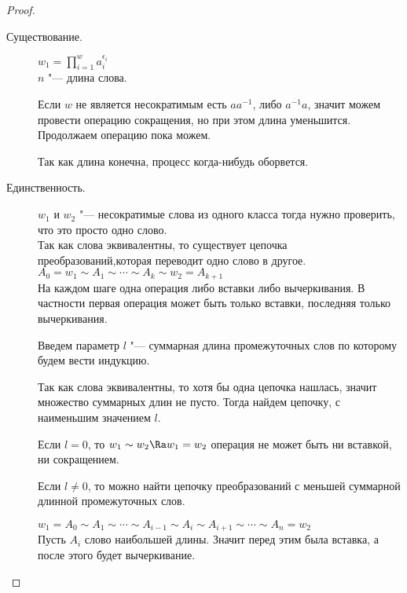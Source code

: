 \begin{proof}
 \begin{description}
 \item[Существование.]
 $w_1 = \prod_{i = 1}^{w}a_i^{\epsilon_i}$\\
 $n$ "--- длина слова.

 Если $w$ не является несократимым есть $aa^{-1}$, либо $a^{-1}a$, значит можем провести операцию 
 сокращения, но при этом длина уменьшится. Продолжаем операцию пока можем.

 Так как длина конечна, процесс когда-нибудь оборвется.
 
 \item[Единственность.]
 $w_1$ и $w_2$ "--- несократимые слова из одного класса тогда нужно проверить, что это просто одно слово.\\
 Так как слова эквивалентны, то существует цепочка преобразований,которая переводит одно слово в другое.
 $A_0 = w_1 \sim A_1 \sim \cdots \sim A_k \sim w_2 = A_{k + 1}$\\
 На каждом шаге одна операция либо вставки либо вычеркивания. В частности первая операция может быть
 только вставки, последняя только вычеркивания.  
 
 Введем параметр $l$ "--- суммарная длина промежуточных слов по которому будем вести индукцию.

 Так как слова эквивалентны, то хотя бы одна цепочка нашлась, значит 
 множество суммарных длин не пусто. Тогда найдем цепочку, с наименьшим значением $l$.

 Если $l = 0$, то $w_1 \sim w_2 \Ra w_1 = w_2$
 операция не может быть ни вставкой, ни сокращением.

 Если $l \ne 0$, то можно найти цепочку преобразований 
 с меньшей суммарной длинной промежуточных слов.

 $w_1 = A_0 \sim A_1 \sim \cdots \sim A_{i - 1} \sim A_i \sim A_{i + 1} \sim \cdots \sim A_n = w_2$\\
 Пусть $A_i$ слово наибольшей длины. Значит перед этим была вставка, а после этого будет вычеркивание.


\end{description}
\end{proof}
